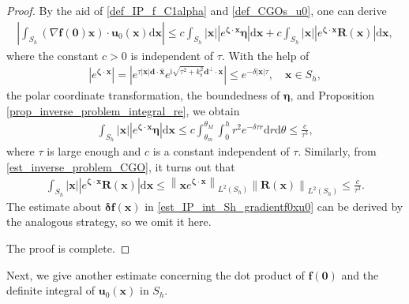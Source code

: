 \documentclass[11pt,reqno,oneside]{amsart}
\theoremstyle{definition}
\theoremstyle{remark}
\numberwithin{equation}{section}
\numberwithin{equation}{section}
\theoremstyle{remark}
\begin{document}
\begin{proof}
	By the aid of \eqref{def_IP_f_C1alpha} and \eqref{def_CGOs_u0}, one can derive 
	\begin{align*} 
		\left| \int_{S_h} \left(\nabla \mathbf{f} \left(\bm{0}\right) \mathbf{x}\right) \cdot \mathbf{u}_0\left(\mathbf{x}\right) \mathrm{d}\mathbf{x} \right| \leqslant c \int_{S_h} \left|\mathbf{x}\right| \left|e^{\bm{\zeta} \cdot \mathbf{x}} \bm{\eta} \right| \mathrm{d}\mathbf{x} + c \int_{S_h} \left|\mathbf{x}\right| \left|e^{\bm{\zeta} \cdot \mathbf{x}} \mathbf{R}\left(\mathbf{x}\right)\right| \mathrm{d}\mathbf{x},
	\end{align*}
	where the constant $ c>0 $ is independent of $ \tau $. With the help of 
	\begin{align} \label{ineq_IP_ezetax_Sh}
		\left| e^{\bm{\zeta} \cdot \mathbf{x}} \right| = \left| e^{ \tau \left|\mathbf{x}\right| \mathbf{d}\cdot\hat{\mathbf{x}} } e^{\mathrm{i}\sqrt{ \tau^2 + k_{\mathrm{s}}^2 } \mathbf{d}^{\perp}\cdot\mathbf{x}} \right| \leqslant e^{-\delta \left|\mathbf{x}\right| \tau} , \quad \mathbf{x}\in S_h,
	\end{align}
	the polar coordinate transformation, the boundedness of $ \bm{\eta} $, and Proposition \ref{prop_inverse_problem_integral_re}, we obtain 
	\begin{align*} 
		\int_{S_h} \left|\mathbf{x}\right| \left|e^{\bm{\zeta} \cdot \mathbf{x}} \bm{\eta} \right| \mathrm{d}\mathbf{x} \leqslant c \int_{\theta_m}^{\theta_M} \int_{0}^{h} r^2 e^{-\delta \tau r} \mathrm{d}r \mathrm{d}\theta 
		\leqslant \frac{c}{\tau^3} ,
	\end{align*}
	where $ \tau $ is large enough and $ c $ is a constant independent of $ \tau $. Similarly, from \eqref{est_inverse_problem_CGO}, it turns out that
	\begin{align*} 
		\int_{S_h} \left|\mathbf{x}\right| \left|e^{\bm{\zeta} \cdot \mathbf{x}} \mathbf{R}\left(\mathbf{x}\right)\right| \mathrm{d}\mathbf{x} \leqslant \left\| \mathbf{x} e^{\bm{\zeta} \cdot \mathbf{x}} \right\|_{L^2 \left(S_h\right)} \left\| \mathbf{R}\left(\mathbf{x}\right) \right\|_{L^2 \left(S_h\right)} \leqslant \frac{c}{\tau^3} .
	\end{align*}
	The estimate about $ \bm{\delta} \mathbf{f} \left(\mathbf{x}\right) $ in \eqref{est_IP_int_Sh_gradientf0xu0} can be derived by the analogous strategy, so we omit it here.
	
	The proof is complete.
\end{proof}

Next, we give another estimate concerning the dot product of $ \mathbf{f}\left(\bm{0}\right) $ and the definite integral of $\mathbf{u}_0\left(\mathbf{x}\right) $ in $ S_h $.
\end{document}
